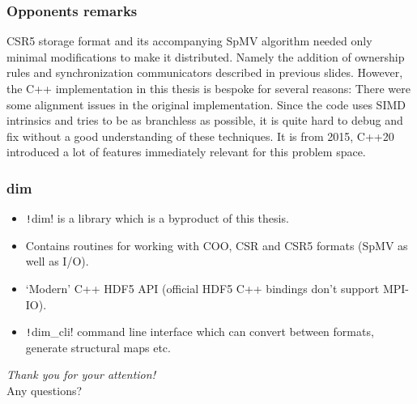 \documentclass{beamer}
\newcommand{\csre}[1]{\texttt!#1!}
\begin{document}
\begin{frame}
    \frametitle{Opponents remarks}

    \begin{outline}
        \1 CSR5 storage format and its accompanying SpMV algorithm needed only minimal modifications to make it distributed.
        Namely the addition of ownership rules and synchronization communicators described in previous slides.
        \1 However, the C++ implementation in this thesis is bespoke for several reasons:
        \2 There were some alignment issues in the original implementation.
        \2 Since the code uses SIMD intrinsics and tries to be as branchless as possible, it is quite hard to debug and fix without a good
        understanding of these techniques.
        \2 It is from 2015, C++20 introduced a lot of features immediately relevant for this problem space.
    \end{outline}
\end{frame}

\begin{frame}
    \frametitle{dim}
    \begin{itemize}
        \item \csre{dim} is a library which is a byproduct of this thesis.
        \item Contains routines for working with COO, CSR and CSR5 formats (SpMV as well as I/O).
        \item `Modern' C++ HDF5 API (official HDF5 C++ bindings don't support MPI-IO).
        \item \csre{dim_cli} command line interface which can convert between formats, generate structural maps etc.
    \end{itemize}
\end{frame}

\begin{frame}
    \centering \Huge
    \emph{Thank you for your attention!} \\
    \Large
    Any questions?
\end{frame}
\end{document}
